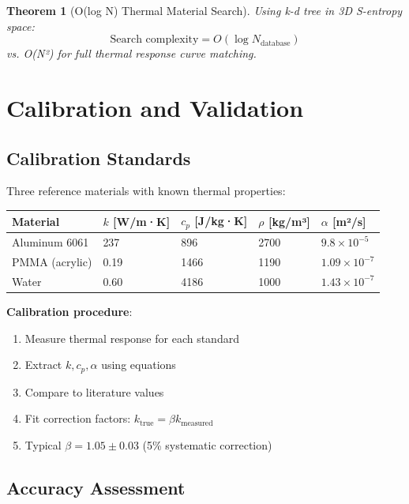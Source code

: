 \documentclass[12pt,a4paper]{article}
\newtheorem{theorem}{Theorem}
\begin{document}
\begin{theorem}[O(log N) Thermal Material Search]
Using k-d tree in 3D S-entropy space:
\begin{equation}
\text{Search complexity} = O(\log N_{\text{database}})
\end{equation}
vs. O(N²) for full thermal response curve matching.
\end{theorem}

\section{Calibration and Validation}

\subsection{Calibration Standards}

Three reference materials with known thermal properties:

\begin{center}
\begin{tabular}{|l|l|l|l|l|}
\hline
\textbf{Material} & \textbf{$k$ [W/m·K]} & \textbf{$c_p$ [J/kg·K]} & \textbf{$\rho$ [kg/m³]} & \textbf{$\alpha$ [m²/s]} \\
\hline
Aluminum 6061 & 237 & 896 & 2700 & $9.8 \times 10^{-5}$ \\
PMMA (acrylic) & 0.19 & 1466 & 1190 & $1.09 \times 10^{-7}$ \\
Water & 0.60 & 4186 & 1000 & $1.43 \times 10^{-7}$ \\
\hline
\end{tabular}
\end{center}

\textbf{Calibration procedure}:
\begin{enumerate}
\item Measure thermal response for each standard
\item Extract $k, c_p, \alpha$ using equations
\item Compare to literature values
\item Fit correction factors: $k_{\text{true}} = \beta k_{\text{measured}}$
\item Typical $\beta = 1.05 \pm 0.03$ (5\% systematic correction)
\end{enumerate}

\subsection{Accuracy Assessment}
\end{document}
